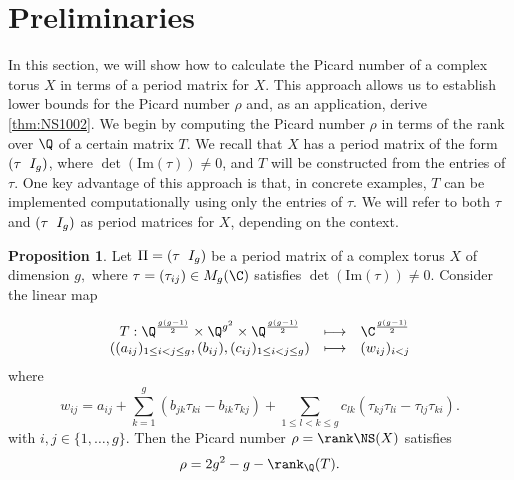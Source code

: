 \documentclass[11pt,leqno]{article}
\theoremstyle{definition}
\newtheorem{proposition}{Proposition}[section]
\begin{document}
\section{Preliminaries}
\label{sec2}
In this section, we will show how to calculate the Picard number of a complex torus $X$ in terms of a period matrix for $X$. This approach allows us to establish lower bounds for the Picard number $\rho$ and, as an application, derive \cref{thm:NS1002}. We begin by computing the Picard number $\rho$ in terms of the rank over $\Q$ of a certain matrix $T$. We recall \cite[Proposition 1.1]{birkenhake1999complex} that $X$ has a period matrix of the form $(\tau\hspace{0.2cm}I_g)$, where $\det(\mathrm{Im}(\tau))\neq0$, and $T$ will be constructed from the entries of $\tau$. One key advantage of this approach is that, in concrete examples, $T$ can be implemented computationally using only the entries of $\tau.$ We will refer to both $\tau$ and $(\tau\hspace{0.2cm}I_g)$ as period matrices for $X$, depending on the context.

\begin{proposition}
\label{Th:NS}
    Let $\Pi=(\tau\hspace{0.2cm}I_g)$ be a period matrix of a complex torus $X$ of dimension $g,$ where $\tau=(\tau_{ij})\in M_g(\C)$ satisfies $\det(\mathrm{Im}(\tau))\neq0.$ Consider the linear map
    
    \begin{equation*}
 \begin{array}{cccc}
     T:\Q^{\frac{g(g-1)}{2}}\times\Q^{g^2}\times\Q^{\frac{g(g-1)}{2}}  & \longmapsto & \C^{\frac{g(g-1)}{2}} \\
      ((a_{ij})_{1\leq i<j\leq g},(b_{ij}),(c_{ij})_{1\leq i<j\leq g}) & \longmapsto & (w_{ij})_{i<j}
\end{array}
\end{equation*}
where   
$$
w_{ij}=a_{ij}+\sum_{k=1}^g(b_{jk}\tau_{ki}-b_{ik}\tau_{kj})+\sum_{1\leq l< k\leq g}c_{lk}(\tau_{kj}\tau_{li}-\tau_{lj}\tau_{ki}).
$$
with $i,j\in\{1,\dots,g\}$. Then the Picard number $\rho=\rank\NS(X)$ satisfies 
$$
\rho=2g^2-g-\rank_{\Q} (T).
$$
\end{proposition}
\end{document}
